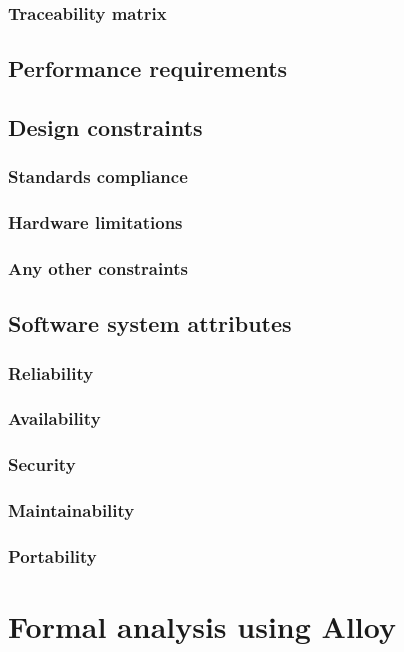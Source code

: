 \documentclass[11pt,twoside]{article}
\begin{document}
\newpage

		\subsubsection{Traceability matrix}
	\subsection{Performance requirements}
	\subsection{Design constraints}
		\subsubsection{Standards compliance}
		\subsubsection{Hardware limitations}
		\subsubsection{Any other constraints}
	\subsection{Software system attributes}
		\subsubsection{Reliability}
		\subsubsection{Availability}
		\subsubsection{Security}
		\subsubsection{Maintainability}
		\subsubsection{Portability}
		
\section{Formal analysis using Alloy}
\end{document}
